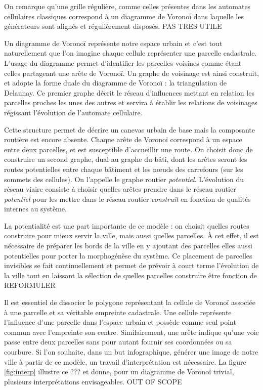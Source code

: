 \documentclass[10pt]{article}
\begin{document}
On remarque qu'une grille régulière, comme celles présentes dans les
automates cellulaires classiques correspond à un diagramme de Voronoï
dans laquelle les générateurs sont alignés et régulièrement
disposés. PAS TRES UTILE

Un diagramme de Voronoï représente notre espace urbain et c'est tout
naturellement que l'on imagine chaque cellule représenter une parcelle
cadastrale. L'usage du diagramme permet d'identifier les parcelles
voisines comme étant celles partageant une arête de Voronoï. Un graphe
de voisinage est ainsi construit, et adopte la forme duale du
diagramme de Voronoï : la triangulation de Delaunay. Ce premier graphe
décrit le réseau d'influences mettant en relation les parcelles
proches les unes des autres et servira à établir les relations de
voisinages régissant l'évolution de l'automate cellulaire.

Cette structure permet de décrire un canevas urbain de base mais la
composante routière est encore absente. Chaque arête de Voronoï
correspond à un espace entre deux parcelles, et est susceptible
d'accueillir une route. On choisit donc de construire un second
graphe, dual au graphe du bâti, dont les arêtes seront les routes
potentielles entre chaque bâtiment et les n\oe uds des carrefours (sur
les sommets des cellules). On l'appelle le graphe routier
\textit{potentiel}. L'évolution du réseau viaire consiste à choisir
quelles arêtes prendre dans le réseau routier \textit{potentiel} pour
les mettre dans le réseau routier \textit{construit} en fonction de
qualités internes au système.

La potentialité est une part importante de ce modèle : on choisit
quelles routes construire pour mieux servir la ville, mais aussi
quelles parcelles. À cet effet, il est nécessaire de préparer les
bords de la ville en y ajoutant des parcelles elles aussi potentielles
pour porter la morphogénèse du système. Ce placement de parcelles
invisibles se fait continuellement et permet de prévoir à court terme
l'évolution de la ville tout en laissant la sélection de quelles
parcelles construire être fonction de REFORMULER

Il est essentiel de dissocier le polygone représentant la cellule de
Voronoï associée à une parcelle et sa véritable empreinte
cadastrale. Une cellule représente l'influence d'une parcelle dans
l'espace urbain et possède comme seul point commun avec l'empreinte
son centre. Similairement, une arête indique qu'une voie passe entre
deux parcelles sans pour autant fournir ses coordonnées ou sa
courbure. Si l'on souhaite, dans un but infographique, générer une
image de notre ville à partir de ce modèle, un travail
d'interprétation est nécessaire. La figure \ref{fig:interp} illustre
ce ??? et donne, pour un diagramme de Voronoï trivial, plusieurs
interprétations envisageables. OUT OF SCOPE
\end{document}
